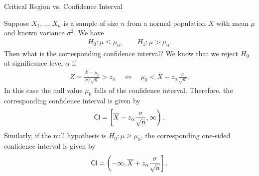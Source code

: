 \begin{frame}{Critical Region vs. Confidence Interval}

\justifying
Suppose $X_1, \ldots, X_n$ is a sample of size $n$ from a normal population $X$ with mean $\mu$ and known variance $\sigma^2$. We have
\footnotesize
\begin{align*}
H_0: \mu \leq \mu_0, \qquad H_1: \mu > \mu_0.
\end{align*}
\normalsize
Then  what is the corresponding confidence interval? We know that we reject $H_0$ at significance level $\alpha$ if
\footnotesize
\begin{align*}
Z = \frac{\overline{X} - \mu_0}{\sigma/\sqrt{n}} > z_{\alpha}\quad\Leftrightarrow \quad \mu_0 < \overline{X} - z_{\alpha}\frac{\sigma}{\sqrt{n}}.
\end{align*}
\normalsize
In this case the null value $\mu_0$ falls  of the confidence interval. Therefore, the corresponding confidence interval is given by
\footnotesize
\begin{align*}
\mathsf{CI} = \left[\overline{X} - z_{\alpha}\frac{\sigma}{\sqrt{n}}, \infty \right).
\end{align*}
\normalsize
Similarly, if the null hypothesis is $H_0: \mu\geq \mu_0$, the corresponding one-sided confidence interval is given by
\footnotesize
\begin{align*}
\mathsf{CI} = \left(-\infty, \overline{X} + z_{\alpha}\frac{\sigma}{\sqrt{n}} \right].
\end{align*}
\normalsize



\end{frame}
